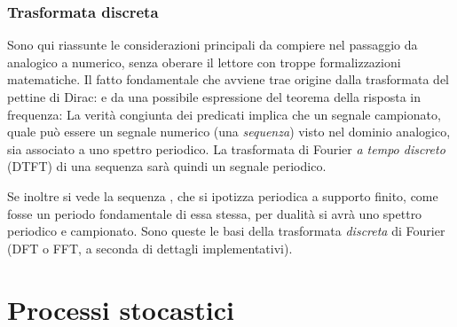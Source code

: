 		\subsubsection{Trasformata discreta}
Sono qui riassunte le considerazioni principali da compiere nel passaggio da analogico a numerico, senza oberare il lettore con troppe formalizzazioni matematiche. Il fatto fondamentale che avviene trae origine dalla trasformata del pettine di Dirac: 
e da una possibile espressione del teorema della risposta in frequenza: 
La verità congiunta dei predicati implica che un segnale campionato, quale può essere un segnale numerico (una {\em sequenza}) visto nel dominio analogico, sia associato a uno spettro periodico. La trasformata di Fourier {\em a tempo discreto} (DTFT) di una sequenza sarà quindi un segnale periodico.

Se inoltre si vede la sequenza , che si ipotizza periodica a supporto finito, come fosse un periodo fondamentale di essa stessa, per dualità si avrà uno spettro periodico e campionato. Sono queste le basi della trasformata {\em discreta} di Fourier (DFT o FFT, a seconda di dettagli implementativi).
\section{Processi stocastici} %
